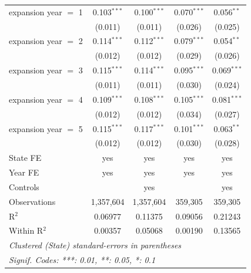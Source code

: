 \begin{table}[htbp]
\begin{tabular}{lcccc}
      expansion year $=$ 1  & 0.103$^{***}$ & 0.100$^{***}$  & 0.070$^{***}$ & 0.056$^{**}$\\   
                            & (0.011)       & (0.011)        & (0.026)       & (0.025)\\   
      expansion year $=$ 2  & 0.114$^{***}$ & 0.112$^{***}$  & 0.079$^{***}$ & 0.054$^{**}$\\   
                            & (0.012)       & (0.012)        & (0.029)       & (0.026)\\   
      expansion year $=$ 3  & 0.115$^{***}$ & 0.114$^{***}$  & 0.095$^{***}$ & 0.069$^{***}$\\   
                            & (0.011)       & (0.011)        & (0.030)       & (0.024)\\   
      expansion year $=$ 4  & 0.109$^{***}$ & 0.108$^{***}$  & 0.105$^{***}$ & 0.081$^{***}$\\   
                            & (0.012)       & (0.012)        & (0.034)       & (0.027)\\   
      expansion year $=$ 5  & 0.115$^{***}$ & 0.117$^{***}$  & 0.101$^{***}$ & 0.063$^{**}$\\   
                            & (0.012)       & (0.012)        & (0.030)       & (0.028)\\   
      State FE              & yes           & yes            & yes           & yes\\  
      Year FE               & yes           & yes            & yes           & yes\\  
      Controls              &               & yes            &               & yes\\  
      Observations          & 1,357,604     & 1,357,604      & 359,305       & 359,305\\  
      R$^2$                 & 0.06977       & 0.11375        & 0.09056       & 0.21243\\  
      Within R$^2$          & 0.00357       & 0.05068        & 0.00190       & 0.13565\\  
      \midrule \midrule
      \multicolumn{5}{l}{\emph{Clustered (State) standard-errors in parentheses}}\\
      \multicolumn{5}{l}{\emph{Signif. Codes: ***: 0.01, **: 0.05, *: 0.1}}\\
   \end{tabular}
\end{table}


